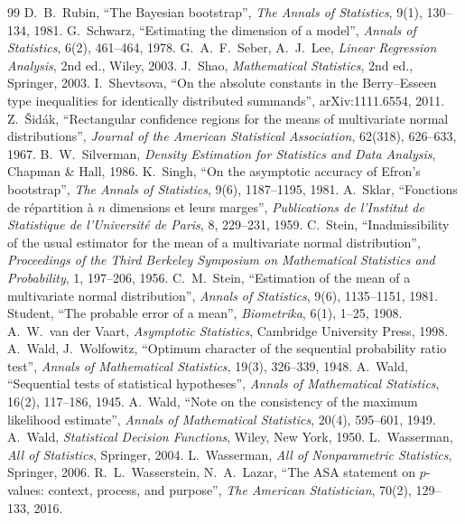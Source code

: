 \documentclass[main.tex]{subfiles}
\begin{document}
\begin{thebibliography}{99}
 D.~B.~Rubin, ``The Bayesian bootstrap'', \emph{The Annals of Statistics}, 9(1), 130--134, 1981.
 G.~Schwarz, ``Estimating the dimension of a model'', \emph{Annals of Statistics}, 6(2), 461--464, 1978.
 G.~A.~F.~Seber, A.~J.~Lee, \emph{Linear Regression Analysis}, 2nd ed., Wiley, 2003.
 J.~Shao, \emph{Mathematical Statistics}, 2nd ed., Springer, 2003.
 I.~Shevtsova, ``On the absolute constants in the Berry--Esseen type inequalities for identically distributed summands'', arXiv:1111.6554, 2011.
 Z.~\v{S}idák, ``Rectangular confidence regions for the means of multivariate normal distributions'', \emph{Journal of the American Statistical Association}, 62(318), 626--633, 1967.
 B.~W.~Silverman, \emph{Density Estimation for Statistics and Data Analysis}, Chapman \& Hall, 1986.
 K.~Singh, ``On the asymptotic accuracy of Efron's bootstrap'', \emph{The Annals of Statistics}, 9(6), 1187--1195, 1981.
 A.~Sklar, ``Fonctions de répartition à $n$ dimensions et leurs marges'', \emph{Publications de l'Institut de Statistique de l'Université de Paris}, 8, 229--231, 1959.
 C.~Stein, ``Inadmissibility of the usual estimator for the mean of a multivariate normal distribution'', \emph{Proceedings of the Third Berkeley Symposium on Mathematical Statistics and Probability}, 1, 197--206, 1956.
 C.~M.~Stein, ``Estimation of the mean of a multivariate normal distribution'', \emph{Annals of Statistics}, 9(6), 1135--1151, 1981.
 Student, ``The probable error of a mean'', \emph{Biometrika}, 6(1), 1--25, 1908.
 A.~W.~van der Vaart, \emph{Asymptotic Statistics}, Cambridge University Press, 1998.
 A.~Wald, J.~Wolfowitz, ``Optimum character of the sequential probability ratio test'', \emph{Annals of Mathematical Statistics}, 19(3), 326--339, 1948.
 A.~Wald, ``Sequential tests of statistical hypotheses'', \emph{Annals of Mathematical Statistics}, 16(2), 117--186, 1945.
 A.~Wald, ``Note on the consistency of the maximum likelihood estimate'', \emph{Annals of Mathematical Statistics}, 20(4), 595--601, 1949.
 A.~Wald, \emph{Statistical Decision Functions}, Wiley, New York, 1950.
 L.~Wasserman, \emph{All of Statistics}, Springer, 2004.
 L.~Wasserman, \emph{All of Nonparametric Statistics}, Springer, 2006.
 R.~L.~Wasserstein, N.~A.~Lazar, ``The ASA statement on $p$-values: context, process, and purpose'', \emph{The American Statistician}, 70(2), 129--133, 2016.

\end{thebibliography}
\end{document}
